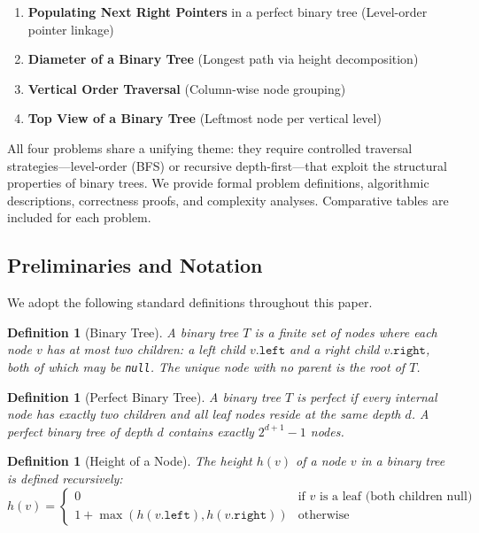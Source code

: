 \documentclass[10pt,journal,compsoc,onecolumn]{IEEEtran}
\newtheorem{definition}[theorem]{Definition}
\begin{document}
\begin{enumerate}
    \item \textbf{Populating Next Right Pointers} in a perfect binary tree (Level-order pointer linkage)
    \item \textbf{Diameter of a Binary Tree} (Longest path via height decomposition)
    \item \textbf{Vertical Order Traversal} (Column-wise node grouping)
    \item \textbf{Top View of a Binary Tree} (Leftmost node per vertical level)
\end{enumerate}

All four problems share a unifying theme: they require controlled traversal strategies---level-order (BFS) or recursive depth-first---that exploit the structural properties of binary trees. We provide formal problem definitions, algorithmic descriptions, correctness proofs, and complexity analyses. Comparative tables are included for each problem.

\subsection{Preliminaries and Notation}

We adopt the following standard definitions throughout this paper.

\begin{definition}[Binary Tree]
A binary tree $T$ is a finite set of nodes where each node $v$ has at most two children: a left child $v.\texttt{left}$ and a right child $v.\texttt{right}$, both of which may be \texttt{null}. The unique node with no parent is the \emph{root} of $T$.
\end{definition}

\begin{definition}[Perfect Binary Tree]
A binary tree $T$ is \emph{perfect} if every internal node has exactly two children and all leaf nodes reside at the same depth $d$. A perfect binary tree of depth $d$ contains exactly $2^{d+1} - 1$ nodes.
\end{definition}

\begin{definition}[Height of a Node]
The height $h(v)$ of a node $v$ in a binary tree is defined recursively:
\[
h(v) = \begin{cases}
0 & \text{if } v \text{ is a leaf (both children null)} \\
1 + \max(h(v.\texttt{left}), h(v.\texttt{right})) & \text{otherwise}
\end{cases}
\]
\end{definition}
\end{document}
